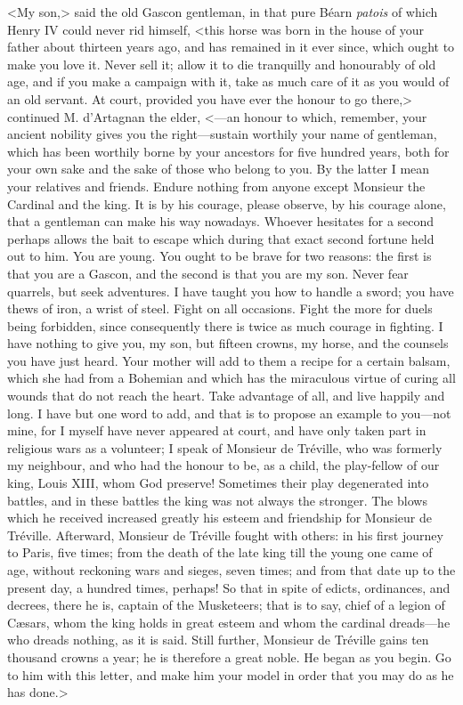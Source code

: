 <My son,> said the old Gascon gentleman, in that pure Béarn \textit{patois} of which Henry IV could never rid himself, <this horse was born in the house of your father about thirteen years ago, and has remained in it ever since, which ought to make you love it. Never sell it; allow it to die tranquilly and honourably of old age, and if you make a campaign with it, take as much care of it as you would of an old servant. At court, provided you have ever the honour to go there,> continued M. d'Artagnan the elder, <---an honour to which, remember, your ancient nobility gives you the right---sustain worthily your name of gentleman, which has been worthily borne by your ancestors for five hundred years, both for your own sake and the sake of those who belong to you. By the latter I mean your relatives and friends. Endure nothing from anyone except Monsieur the Cardinal and the king. It is by his courage, please observe, by his courage alone, that a gentleman can make his way nowadays. Whoever hesitates for a second perhaps allows the bait to escape which during that exact second fortune held out to him. You are young. You ought to be brave for two reasons: the first is that you are a Gascon, and the second is that you are my son. Never fear quarrels, but seek adventures. I have taught you how to handle a sword; you have thews of iron, a wrist of steel. Fight on all occasions. Fight the more for duels being forbidden, since consequently there is twice as much courage in fighting. I have nothing to give you, my son, but fifteen crowns, my horse, and the counsels you have just heard. Your mother will add to them a recipe for a certain balsam, which she had from a Bohemian and which has the miraculous virtue of curing all wounds that do not reach the heart. Take advantage of all, and live happily and long. I have but one word to add, and that is to propose an example to you---not mine, for I myself have never appeared at court, and have only taken part in religious wars as a volunteer; I speak of Monsieur de Tréville, who was formerly my neighbour, and who had the honour to be, as a child, the play-fellow of our king, Louis XIII, whom God preserve! Sometimes their play degenerated into battles, and in these battles the king was not always the stronger. The blows which he received increased greatly his esteem and friendship for Monsieur de Tréville. Afterward, Monsieur de Tréville fought with others: in his first journey to Paris, five times; from the death of the late king till the young one came of age, without reckoning wars and sieges, seven times; and from that date up to the present day, a hundred times, perhaps! So that in spite of edicts, ordinances, and decrees, there he is, captain of the Musketeers; that is to say, chief of a legion of Cæsars, whom the king holds in great esteem and whom the cardinal dreads---he who dreads nothing, as it is said. Still further, Monsieur de Tréville gains ten thousand crowns a year; he is therefore a great noble. He began as you begin. Go to him with this letter, and make him your model in order that you may do as he has done.> 

